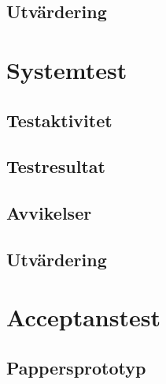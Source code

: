\documentclass[a4paper,10pt]{article}
\begin{document}
\subsection{Utvärdering}
\section{Systemtest}
\subsection{Testaktivitet}
\subsection{Testresultat}
\subsection{Avvikelser}
\subsection{Utvärdering}
\section{Acceptanstest}
\subsection{Pappersprototyp}
\end{document}
